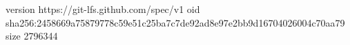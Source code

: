 version https://git-lfs.github.com/spec/v1
oid sha256:2458669a75879778c59e51c25ba7c7de92ad8e97e2bb9d16704026004c70aa79
size 2796344
